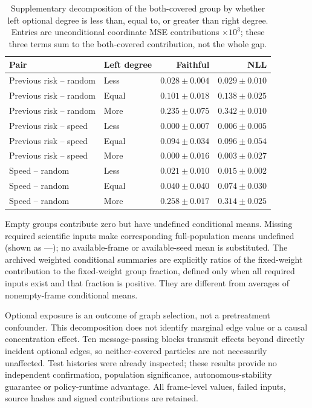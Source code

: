 \begin{table}[ht]
\centering\small
\caption{Supplementary decomposition of the both-covered group by whether
left optional degree is less than, equal to, or greater than right degree.
Entries are unconditional coordinate MSE contributions $\times10^3$;
these three terms sum to the both-covered contribution, not the whole gap.}
\label{tab:optional-exposure-both}
\begin{tabular}{llrr}
\toprule
Pair & Left degree & Faithful & NLL\\
\midrule
Previous risk -- random & Less & $0.028\pm0.004$ & $0.029\pm0.010$\\
Previous risk -- random & Equal & $0.101\pm0.018$ & $0.138\pm0.025$\\
Previous risk -- random & More & $0.235\pm0.075$ & $0.342\pm0.010$\\
Previous risk -- speed & Less & $0.000\pm0.007$ & $0.006\pm0.005$\\
Previous risk -- speed & Equal & $0.094\pm0.034$ & $0.096\pm0.054$\\
Previous risk -- speed & More & $0.000\pm0.016$ & $0.003\pm0.027$\\
Speed -- random & Less & $0.021\pm0.010$ & $0.015\pm0.002$\\
Speed -- random & Equal & $0.040\pm0.040$ & $0.074\pm0.030$\\
Speed -- random & More & $0.258\pm0.017$ & $0.314\pm0.025$\\
\bottomrule
\end{tabular}
\end{table}

Empty groups contribute zero but have undefined conditional means. Missing
required scientific inputs make corresponding full-population means undefined
(shown as ---); no available-frame or available-seed mean is substituted.
The archived weighted conditional summaries are explicitly ratios of the
fixed-weight contribution to the fixed-weight group fraction, defined only
when all required inputs exist and that fraction is positive. They are
different from averages of nonempty-frame conditional means.

Optional exposure is an outcome of graph selection, not a pretreatment
confounder. This decomposition does not identify marginal edge value or a
causal concentration effect. Ten message-passing blocks transmit effects
beyond directly incident optional edges, so neither-covered particles are
not necessarily unaffected. Test histories were already inspected; these
results provide no independent confirmation, population significance,
autonomous-stability guarantee or policy-runtime advantage. All frame-level
values, failed inputs, source hashes and signed contributions are retained.
